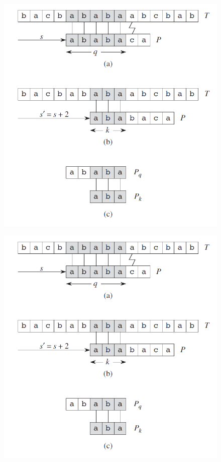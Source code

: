 \begin{frame}
\begin{figure}[h!]
    \centering
    \includegraphics[scale=0.7]{pic3.PNG}
\end{figure}
\end{frame}

\begin{frame}
\begin{figure}[h!]
    \centering
    \includegraphics[scale=0.7]{pic3.PNG}
\end{figure}

\end{frame}


